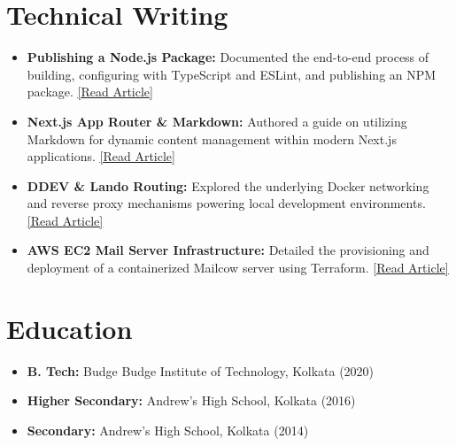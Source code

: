 \documentclass[a4paper,10pt]{article}
\newcommand{\resumeItem}[1]{\item\small{#1}}
\begin{document}
\section{Technical Writing}
\begin{itemize}[leftmargin=0.15in, label={}]
  \resumeItem{\textbf{Publishing a Node.js Package:} Documented the end-to-end process of building, configuring with TypeScript and ESLint, and publishing an NPM package. \href{https://dev.to/mitrakumar/journey-of-creating-and-publishing-a-nodejs-package-with-typescript-eslint-support-3gh7}{\underline{[Read Article]}}}
  \resumeItem{\textbf{Next.js App Router \& Markdown:} Authored a guide on utilizing Markdown for dynamic content management within modern Next.js applications. \href{https://dev.to/mitrakumar/using-markdown-to-manage-content-to-nextjs-app-router-420j}{\underline{[Read Article]}}}
  \resumeItem{\textbf{DDEV \& Lando Routing:} Explored the underlying Docker networking and reverse proxy mechanisms powering local development environments. \href{https://dev.to/mitrakumar/magic-behind-ddev-lando-routing-37m}{\underline{[Read Article]}}}
  \resumeItem{\textbf{AWS EC2 Mail Server Infrastructure:} Detailed the provisioning and deployment of a containerized Mailcow server using Terraform. \href{https://dev.to/mitrakumar/setting-up-mailcow-on-mail-server-on-an-ec2-instance-2bf6}{\underline{[Read Article]}}}
\end{itemize}

\section{Education}
\begin{itemize}[leftmargin=0.15in, label={}]
  \item \small{\textbf{B. Tech:} Budge Budge Institute of Technology, Kolkata (2020)}
  \vspace{-3pt}
  \item \small{\textbf{Higher Secondary:} Andrew's High School, Kolkata (2016)}
  \vspace{-3pt}
  \item \small{\textbf{Secondary:} Andrew's High School, Kolkata (2014)}
\end{itemize}
\end{document}
